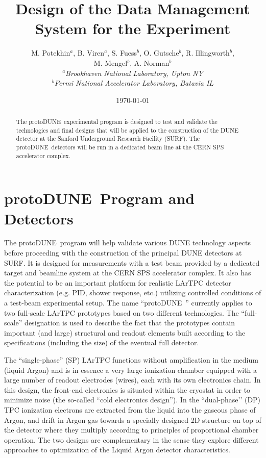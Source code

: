 \documentclass[pdftex,12pt,letter]{article}
\title{Design of the Data Management System for the \pd Experiment}
\date{\today}
\author{M. Potekhin$^a$, B. Viren$^a$, S. Fuess$^b$, O. Gutsche$^b$, R. Illingworth$^b$,\\M. Mengel$^b$,
 A. Norman$^b$\\
$^a$\textit{Brookhaven National Laboratory, Upton NY}\\
$^b$\textit{Fermi National Accelerator Laboratory, Batavia IL}}
\newcommand{\pd}{protoDUNE\ }
\begin{document}
\maketitle

\begin{abstract}

The \pd experimental program is designed to test and validate the technologies and final designs that will be applied to the construction of the DUNE detector at the Sanford Underground Research Facility (SURF).  The \pd detectors will be run in a dedicated beam line at the CERN SPS accelerator complex. 
\end{abstract}


\section{\pd Program and Detectors}
\label{S:1}

The \pd program will help validate various DUNE technology aspects before proceeding with the construction of the principal DUNE detectors at SURF. It is designed for measurements with a test beam provided by a dedicated target and beamline system at the CERN SPS accelerator complex. It also has the potential to be an important platform for realistic LArTPC detector characterization (e.g. PID, shower response, etc.) utilizing controlled conditions of a test-beam experimental setup. The name “\pd” currently applies to two full-scale LArTPC prototypes based on two different technologies. The “full-scale” designation is used to describe the fact that the prototypes contain important (and large) structural and readout elements built according to the specifications (including the size) of the eventual full detector.

The “single-phase” (SP) LArTPC functions without amplification in the medium (liquid Argon) and is in essence a very large ionization chamber equipped with a large number of readout electrodes (wires), each with its own electronics chain. In this design, the front-end electronics is situated within the cryostat in order to minimize noise (the so-called “cold electronics design”). In the “dual-phase’’ (DP) TPC ionization electrons are extracted from the liquid into the gaseous phase of Argon, and drift in Argon gas towards a specially designed 2D structure on top of the detector where they multiply according to principles of proportional chamber operation. The two designs are complementary in the sense they explore different approaches to optimization of the Liquid Argon detector characteristics.
\end{document}
